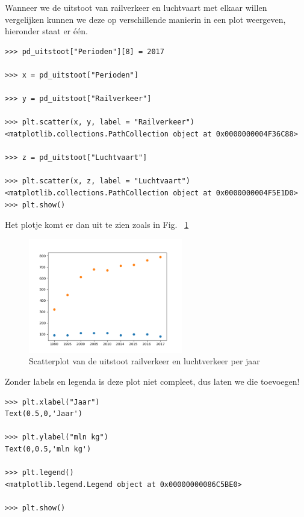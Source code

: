 Wanneer we de uitstoot van railverkeer en luchtvaart met elkaar willen vergelijken kunnen we deze op verschillende manierin in een plot weergeven, hieronder staat er één.

\begin{lstlisting}[frame=single]
>>> pd_uitstoot["Perioden"][8] = 2017

>>> x = pd_uitstoot["Perioden"]

>>> y = pd_uitstoot["Railverkeer"]

>>> plt.scatter(x, y, label = "Railverkeer")
<matplotlib.collections.PathCollection object at 0x0000000004F36C88>

>>> z = pd_uitstoot["Luchtvaart"]

>>> plt.scatter(x, z, label = "Luchtvaart")
<matplotlib.collections.PathCollection object at 0x0000000004F5E1D0>
>>> plt.show()
\end{lstlisting}

Het plotje komt er dan uit te zien zoals in Fig. ~\ref{fig:matplotlib_scatter_1}

\begin{figure}[h]
\begin{center}
\includegraphics[width=0.6\textwidth]{img/matplotlib_scatter_1.png}
\caption{\label{fig:matplotlib_scatter_1} Scatterplot van de uitstoot railverkeer en luchtverkeer per jaar}
\end{center}
\end{figure}

Zonder labels en legenda is deze plot niet compleet, dus laten we die toevoegen!

\begin{lstlisting}[frame=single]
>>> plt.xlabel("Jaar")
Text(0.5,0,'Jaar')

>>> plt.ylabel("mln kg")
Text(0,0.5,'mln kg')

>>> plt.legend()
<matplotlib.legend.Legend object at 0x00000000086C5BE0>

>>> plt.show()

\end{lstlisting}

